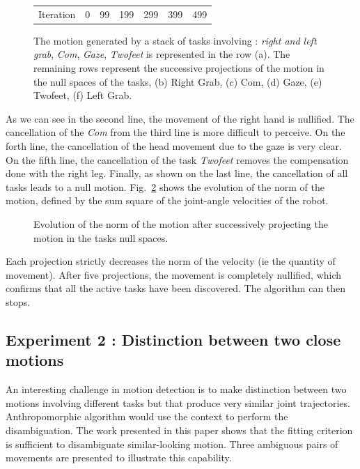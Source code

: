 \documentclass[letterpaper, 10pt, conference]{ieeeconf}      %
\begin{document}
\begin{figure}[t]
\begin{tabular}{c@{}c@{}c@{}c@{}c@{}c@{}c}
\\
Iteration & 0 & 99 & 199 & 299 & 399 & 499\\
\end{tabular}
\caption{The motion generated by a stack of tasks involving :
\emph{right and left grab}, \emph{Com}, \emph{Gaze}, \emph{Twofeet} is represented in the row (a).
The remaining rows represent the successive projections of the motion in the null spaces of the tasks,
(b) Right Grab, (c) Com, (d) Gaze, (e) Twofeet, (f) Left Grab.}
\label{fig:snapshotXpqdot}
\end{figure}
As we can see in the second line, the movement of the right hand is nullified. The cancellation of
the \emph{Com} from the third line is more difficult to perceive. On the forth line, the cancellation
of the head movement due to the gaze is very clear. On the fifth line, the cancellation of the task \emph{Twofeet} 
removes the compensation done with the right leg. Finally, as shown on the last line,
the cancellation of all tasks leads to a null motion.
Fig.~\ref{fig:xp3Pqdot} shows the evolution of the norm of the motion,
defined by the sum square of the joint-angle velocities of the robot.
\begin{figure}[t]
\begin{center}
\resizebox{.48\textwidth}{!} {
      
    }
\end{center}
\caption{Evolution of the norm of the motion after successively projecting the motion in the
	tasks null spaces.}
\label{fig:xp3Pqdot}
\end{figure}
Each projection strictly decreases the norm of the velocity (ie the quantity of  movement). After
five projections, the movement is completely nullified, which confirms that all the active tasks have been
discovered. The algorithm can then stops.

\subsection{Experiment 2 : Distinction between two close motions}
\label{sec:distinc}
An interesting challenge in motion detection
is to make distinction between two motions
involving different tasks but that produce very similar joint trajectories.
Anthropomorphic algorithm would use the context to perform the disambiguation.
The work presented in this paper shows that the fitting criterion
is sufficient to disambiguate similar-looking motion. Three ambiguous pairs of movements
are presented to illustrate this capability.
\end{document}
